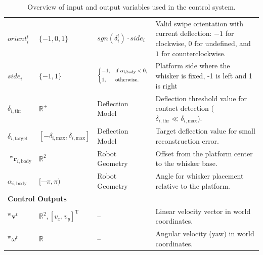 \begin{table}[htb]
\begin{tabular}{p{1cm} p{2.2cm} p{3cm} p{7.8cm}}
        \(orient_{i}^{t}\)                                   & \(\{-1, 0, 1\}\)                                                  & \(sgn(\delta_{i}^{t}) \cdot side_{i}\)                  & Valid swipe orientation with current deflection: \(-1\) for clockwise, \(0\) for undefined, and \(1\) for counterclockwise. \\
        \(side_{i}\)                                         & \(\{-1, 1\}\)                                                     & \(\branch{\alpha_{i,\mathrm{body}} < 0}{-1}{1}\)        & Platform side where the whisker is fixed, -1 is left and 1 is right                                                         \\
        \(\delta_{i, \mathrm{thr}}\)                         & \(\mathbb{R}^{+}\)                                                & Deflection Model                                        & Deflection threshold value for contact detection (\(\delta_{i, \mathrm{thr}}\ll\delta_{i, \mathrm{max}}\)).                 \\
        \(\delta_{i, \mathrm{target}}\)                      & \([-\delta_{\mathrm{i, max}},\delta_{i, \mathrm{max}}]\)          & Deflection Model                                        & Target deflection value for small reconstruction error.                                                                     \\
        \(\;^{\mathrm{w}}\boldsymbol{r}_{i, \mathrm{body}}\) & \(\mathbb{R}^2\)                                                  & Robot Geometry                                          & Offset from the platform center to the whisker base.                                                                        \\
        \(\alpha_{i, \mathrm{body}}\)                        & \([-\pi,\pi)\)                                                    & Robot Geometry                                          & Angle for whisker placement relative to the platform.                                                                       \\
        \midrule
        \multicolumn{4}{l}{\textbf{Control Outputs}} \\
        \midrule
        \(^{\mathrm{w}}\boldsymbol{v}^{t}\)                  & \(\mathbb{R}^2, [v_x, v_y]^\mathrm{T}\)                           & --                                                      & Linear velocity vector in world coordinates.                                                                                \\
        \(^{\mathrm{w}}\omega^{t}\)                          & \(\mathbb{R}\)                                                    & --                                                      & Angular velocity (yaw) in world coordinates.                                                                                \\
        \bottomrule
    \end{tabular}
    \caption{Overview of input and output variables used in the control system.}
    \label{tab:variables}
\end{table}

